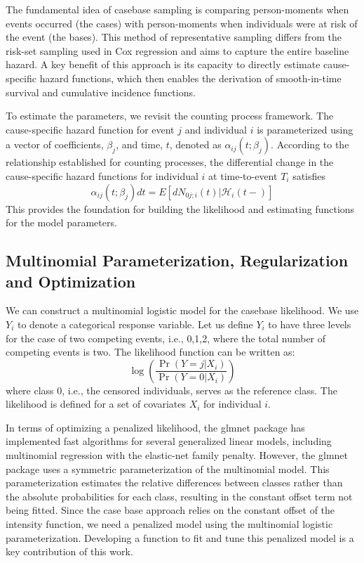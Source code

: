 \documentclass[AMA,Times1COL]{WileyNJDv5} %
\begin{document}
The fundamental idea of casebase sampling is comparing person-moments when events occurred (the cases) with person-moments when individuals were at risk of the event (the bases). This method of representative sampling differs from the risk-set sampling used in Cox regression and aims to capture the entire baseline hazard. A key benefit of this approach is its capacity to directly estimate cause-specific hazard functions, which then enables the derivation of smooth-in-time survival and cumulative incidence functions.

To estimate the parameters, we revisit the counting process framework. The cause-specific hazard function for event $j$ and individual $i$ is parameterized using a vector of coefficients, $\beta_{j}$, and time, $t$, denoted as $\alpha_{ij}(t;\beta_{j})$. According to the relationship established for counting processes, the differential change in the cause-specific hazard functions for individual $i$ at time-to-event $T_i$ satisfies
$$\alpha_{ij}(t;\beta_{j})dt=E[dN_{0j;i}(t)|\mathcal{H}_{i}(t-)]$$
This provides the foundation for building the likelihood and estimating functions for the model parameters.

\subsection{Multinomial Parameterization, Regularization and Optimization}

We can construct a multinomial logistic model for the casebase likelihood. We use $Y_{i}$ to denote a categorical response variable. Let us define $Y_{i}$ to have three levels for the case of two competing events, i.e., {0,1,2}, where the total number of competing events is two. The likelihood function can be written as:
$$\log\left(\frac{\Pr(Y=j|X_i)}{\Pr(Y=0|X_i)}\right)$$ where class 0, i.e., the censored individuals, serves as the reference class. The likelihood is defined for a set of covariates $X_{i}$ for individual $i$.

In terms of optimizing a penalized likelihood, the glmnet package has implemented fast algorithms for several generalized linear models, including multinomial regression with the elastic-net family penalty. However, the glmnet package uses a symmetric parameterization of the multinomial model. This parameterization estimates the relative differences between classes rather than the absolute probabilities for each class, resulting in the constant offset term not being fitted. Since the case base approach relies on the constant offset of the intensity function, we need a penalized model using the multinomial logistic parameterization. Developing a function to fit and tune this penalized model is a key contribution of this work.
\end{document}
